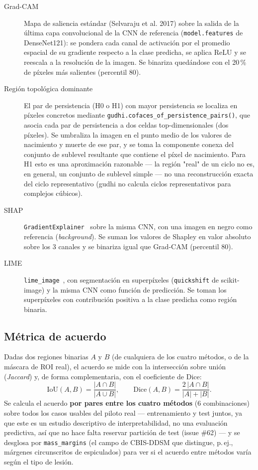 \begin{description}
  \item[Grad-CAM] Mapa de saliencia estándar (Selvaraju et al. 2017) sobre la
        salida de la última capa convolucional de la CNN de referencia
        (\texttt{model.features} de DenseNet121): se pondera cada canal de
        activación por el promedio espacial de su gradiente respecto a la
        clase predicha, se aplica ReLU y se reescala a la resolución de la
        imagen. Se binariza quedándose con el 20\,\% de píxeles más
        salientes (percentil 80).
  \item[Región topológica dominante] El par de persistencia (H0 o H1) con
        mayor persistencia se localiza en píxeles concretos mediante
        \texttt{gudhi.\allowbreak cofaces\_of\_\allowbreak persistence\_pairs()}, que asocia cada
        par de persistencia a dos celdas top-dimensionales (dos píxeles).
        Se umbraliza la imagen en el punto medio de los valores de
        nacimiento y muerte de ese par, y se toma la componente conexa del
        conjunto de sublevel resultante que contiene el píxel de
        nacimiento. Para H1 esto es una aproximación razonable --- la
        región "real" de un ciclo no es, en general, un conjunto de
        sublevel simple --- no una reconstrucción exacta del ciclo
        representativo (gudhi no calcula ciclos representativos para
        complejos cúbicos).
  \item[SHAP] \texttt{GradientExplainer}~\cite{lundberg2017shap} sobre la
        misma CNN, con una imagen en negro como referencia
        (\textit{background}). Se suman los valores de Shapley en valor
        absoluto sobre los 3 canales y se binariza igual que Grad-CAM
        (percentil 80).
  \item[LIME] \texttt{lime\_image}~\cite{ribeiro2016lime}, con segmentación
        en superpíxeles (\texttt{quickshift} de scikit-image) y la misma
        CNN como función de predicción. Se toman los superpíxeles con
        contribución positiva a la clase predicha como región binaria.
\end{description}

\subsection{Métrica de acuerdo}
Dadas dos regiones binarias $A$ y $B$ (de cualquiera de los cuatro métodos,
o de la máscara de ROI real), el acuerdo se mide con la intersección sobre
unión (\textit{Jaccard}) y, de forma complementaria, con el coeficiente de
Dice:
\[
  \mathrm{IoU}(A, B) = \frac{|A \cap B|}{|A \cup B|}, \qquad
  \mathrm{Dice}(A, B) = \frac{2\,|A \cap B|}{|A| + |B|}.
\]
Se calcula el acuerdo \textbf{por pares entre los cuatro métodos} (6
combinaciones) sobre todos los casos usables del piloto real --- entrenamiento
y test juntos, ya que este es un estudio descriptivo de interpretabilidad,
no una evaluación predictiva, así que no hace falta reservar partición de
test (issue \#62) --- y se desglosa por \texttt{mass\_margins} (el campo de
CBIS-DDSM que distingue, p.\,ej., márgenes circunscritos de espiculados) para
ver si el acuerdo entre métodos varía según el tipo de lesión.

